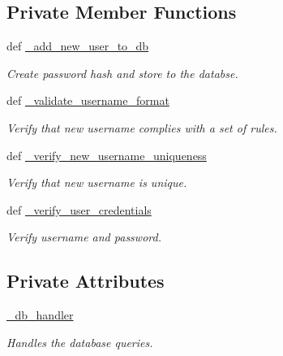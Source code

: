\subsection*{Private Member Functions}
\begin{DoxyCompactItemize}
\item 
def \hyperlink{classrapp__application__authentication__manager_1_1application__authentication__node_1_1ApplicationAuthenticationManager_a5d4f73e942d2a349b536521637a9017a}{\-\_\-add\-\_\-new\-\_\-user\-\_\-to\-\_\-db}
\begin{DoxyCompactList}\small\item\em Create password hash and store to the databse. \end{DoxyCompactList}\item 
def \hyperlink{classrapp__application__authentication__manager_1_1application__authentication__node_1_1ApplicationAuthenticationManager_af6865850e85661e67d775ae4d8f3436f}{\-\_\-validate\-\_\-username\-\_\-format}
\begin{DoxyCompactList}\small\item\em Verify that new username complies with a set of rules. \end{DoxyCompactList}\item 
def \hyperlink{classrapp__application__authentication__manager_1_1application__authentication__node_1_1ApplicationAuthenticationManager_ad813c30b34bdb2d2c29ce03fa6f82983}{\-\_\-verify\-\_\-new\-\_\-username\-\_\-uniqueness}
\begin{DoxyCompactList}\small\item\em Verify that new username is unique. \end{DoxyCompactList}\item 
def \hyperlink{classrapp__application__authentication__manager_1_1application__authentication__node_1_1ApplicationAuthenticationManager_a3e57a2cb944023865629defecceeb6cb}{\-\_\-verify\-\_\-user\-\_\-credentials}
\begin{DoxyCompactList}\small\item\em Verify username and password. \end{DoxyCompactList}\end{DoxyCompactItemize}
\subsection*{Private Attributes}
\begin{DoxyCompactItemize}
\item 
\hyperlink{classrapp__application__authentication__manager_1_1application__authentication__node_1_1ApplicationAuthenticationManager_aad51dbc5ed8b839dc2606eb32c6cc10b}{\-\_\-db\-\_\-handler}
\begin{DoxyCompactList}\small\item\em Handles the database queries. \end{DoxyCompactList}\end{DoxyCompactItemize}


